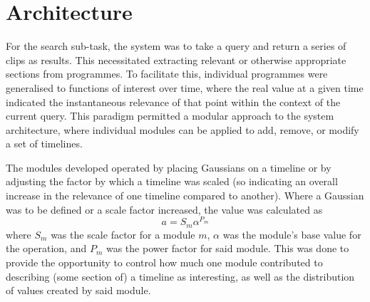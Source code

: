 \documentclass{../acm_proc_article-me11_tweaked}
\begin{document}
\section{Architecture}
For the search sub-task, the system was to take a query and return a series of 
clips as results. This necessitated extracting relevant or otherwise 
appropriate sections from programmes. To facilitate this, individual 
programmes were generalised to functions of interest over time, where the real 
value at a given time indicated the instantaneous relevance of that point 
within the context of the current query. This paradigm permitted a modular 
approach to the system architecture, where individual modules can be applied 
to add, remove, or modify a set of timelines.

The modules developed operated by placing Gaussians on a timeline or by 
adjusting the factor by which a timeline was scaled (so indicating an overall 
increase in the relevance of one timeline compared to another). Where a 
Gaussian was to be defined or a scale factor increased, the value was 
calculated as 
\[a = S_m \alpha^{P_m}\]
where \(S_m\) was the scale factor for a module \(m\), \(\alpha\) was the 
module's base value for the operation, and \(P_m\) was the power factor for 
said module. This was done to provide the opportunity to control how much one 
module contributed to describing (some section of) a timeline as interesting, 
as well as the distribution of values created by said module.
\end{document}
